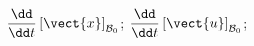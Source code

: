 \begin{corrigebox}[Corrigé]
$\dfrac{\dd }{\dd t}\left[ \vect{x} \right]_{\mathcal{B}_0}$;
$\dfrac{\dd }{\dd t}\left[ \vect{u} \right]_{\mathcal{B}_0}$;
\end{corrigebox}
